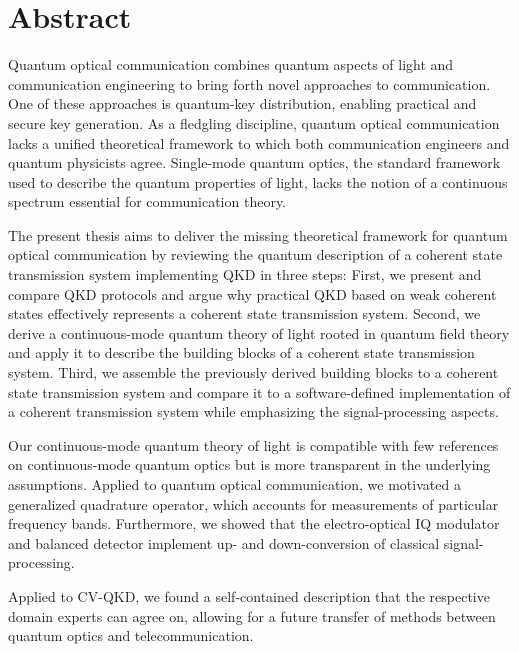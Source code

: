 \section*{Abstract}

Quantum optical communication combines quantum aspects of light and communication engineering to bring forth novel approaches to communication.
One of these approaches is quantum-key distribution, enabling practical and secure key generation.
As a fledgling discipline, quantum optical communication lacks a unified theoretical framework to which both communication engineers and quantum physicists agree.
Single-mode quantum optics, the standard framework used to describe the quantum properties of light, lacks the notion of a continuous spectrum essential for communication theory.

The present thesis aims to deliver the missing theoretical framework for quantum optical communication by reviewing the quantum description of a coherent state transmission system implementing QKD in three steps:
First, we present and compare QKD protocols and argue why practical QKD based on weak coherent states effectively represents a coherent state transmission system.
Second, we derive a continuous-mode quantum theory of light rooted in quantum field theory and apply it to describe the building blocks of a coherent state transmission system.
Third, we assemble the previously derived building blocks to a coherent state transmission system and compare it to a software-defined implementation of a coherent transmission system while emphasizing the signal-processing aspects.

Our continuous-mode quantum theory of light is compatible with few references on continuous-mode quantum optics but is more transparent in the underlying assumptions.
Applied to quantum optical communication, we motivated a generalized quadrature operator, which accounts for measurements of particular frequency bands.
Furthermore, we showed that the electro-optical IQ modulator and balanced detector implement up- and down-conversion of classical signal-processing.

Applied to CV-QKD, we found a self-contained description that the respective domain experts can agree on, allowing for a future transfer of methods between quantum optics and telecommunication.